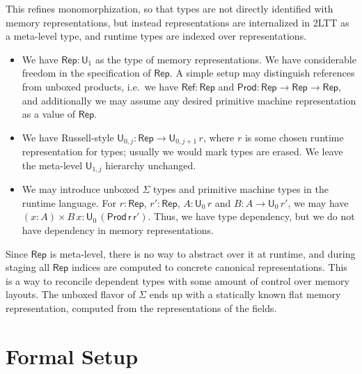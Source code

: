 \documentclass[acmsmall,review]{acmart}
\newcommand{\msf}[1]{\mathsf{#1}}
\renewcommand{\U}{\msf{U}}
\newcommand{\Nat}{\msf{Nat}}
\newcommand{\Rep}{\msf{Rep}}
\theoremstyle{remark}
\begin{document}
This refines monomorphization, so that types are not directly identified with
memory representations, but instead representations are internalized in 2LTT as
a meta-level type, and runtime types are indexed over representations.
\begin{itemize}
\item We have $\Rep : \U_1$ as the type of memory representations. We have
  considerable freedom in the specification of $\Rep$. A simple setup may
  distinguish references from unboxed products, i.e.\ we have $\msf{Ref} : \Rep$
  and $\msf{Prod} : \Rep \to \Rep \to \Rep$, and additionally we may assume
  any desired primitive machine representation as a value of $\Rep$.
\item We have Russell-style $\U_{0,j} : \Rep \to \U_{0, j+1}\,r$, where $r$ is
  some chosen runtime representation for types; usually we would mark types are
  erased. We leave the meta-level $\U_{1,j}$ hierarchy unchanged.
\item We may introduce unboxed $\Sigma$ types and primitive machine types in the
  runtime language. For $r : \Rep$, $r' : \Rep$, $A : \U_{0}\,r$ and $B : A \to
  \U_{0}\,r'$, we may have $(x : A) \times B\,x :
  \U_{0}\,(\msf{Prod\,r\,r'})$. Thus, we have type dependency, but we do not
  have dependency in memory representations.
\end{itemize}
Since $\Rep$ is meta-level, there is no way to abstract over it at runtime, and
during staging all $\Rep$ indices are computed to concrete canonical
representations. This is a way to reconcile dependent types with some amount of
control over memory layouts. The unboxed flavor of $\Sigma$ ends up with a
statically known flat memory representation, computed from the representations
of the fields.


\section{Formal Setup}\label{sec:formal-2ltt}
\end{document}
